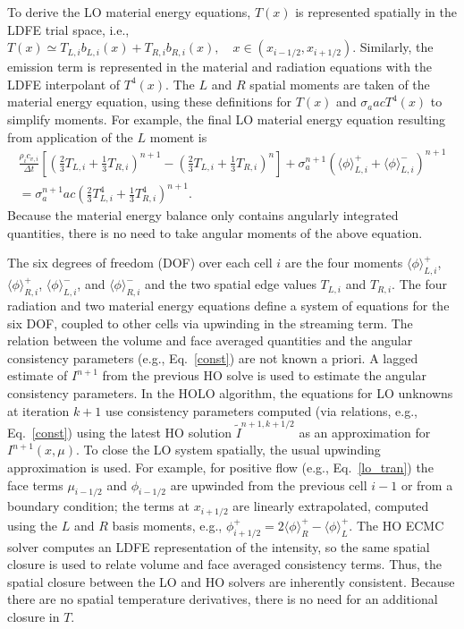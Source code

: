 \documentclass{mc2013}
\newcommand{\mom}[1]{\langle #1 \rangle}
\newcommand{\ir}{{i+1/2}}
\begin{document}
To derive the LO material energy equations, $T(x)$ is represented spatially in
the LDFE trial space, i.e.,
$ T(x) \simeq T_{L,i} b_{L,i}(x) + T_{R,i} b_{R,i}(x),\quad x\in(x_{i-1/2},x_\ir)$.
Similarly, the emission term is represented in the material and radiation equations with the LDFE
interpolant of $T^4(x)$.   The $L$ and $R$ spatial moments are taken of the material
energy equation, using these definitions for $T(x)$ and $\sigma_a a c T^4(x)$ to simplify moments. For example, the final LO material energy
 equation resulting from application of the $L$ moment is
 \begin{multline}\label{lo_mat_dis}
     \frac{\rho_i c_{v,i}}{\Delta t}\left[ \left(\frac{2}{3}T_{L,i} + \frac{1}{3}T_{R,i}
        \right)^{n+1} - \left(\frac{2}{3}T_{L,i} + \frac{1}{3}T_{R,i}
    \right)^{n} \right]  + \sigma_a^{n+1} \left( \mom{\phi}_{L,i}^+ +
    \mom{\phi}_{L,i}^- \right)^{n+1} \\ = \sigma_a^{n+1}a c
\left( \frac{2}{3} T_{L,i}^4 + \frac{1}{3}T_{R,i}^4
        \right)^{n+1}.
\end{multline}
Because the material energy balance
 only contains angularly integrated quantities, there is no need to take angular
 moments of the above equation.  

\label{sec:closure}

The six degrees of freedom (DOF) over each cell $i$ are the four moments $\mom{\phi}_{L,i}^+$,
$\mom{\phi}_{R,i}^+$, $\mom{\phi}_{L,i}^-$, and $\mom{\phi}_{R,i}^-$ and the two
spatial edge values $T_{L,i}$ and $T_{R,i}$. The four radiation and two material
energy equations define a system of equations for the six DOF, coupled to other cells
via upwinding in the streaming term.
The relation between the volume and face averaged quantities and the angular consistency parameters (e.g., Eq.~\eqref{const}) are not known a priori. 
A lagged estimate of $I^{n+1}$ from the previous HO solve is
used to estimate the angular consistency parameters. In the HOLO algorithm, the equations for LO unknowns at iteration $k+1$ use consistency parameters
computed (via relations, e.g., Eq.~\eqref{const}) using the latest HO solution $\tilde{I}^{n+1,k+1/2}$
as an approximation for $I^{n+1}(x,\mu)$. To close the LO system spatially, the usual upwinding
approximation is used.  For example, for positive flow (e.g., Eq.~\eqref{lo_tran}) the face terms $\mu_{i-1/2}$ and $\phi_{i-1/2}$
are upwinded from the previous cell $i-1$ or from a boundary condition; the terms
at $x_{i+1/2}$ are linearly extrapolated, computed using the $L$ and $R$ basis
moments, e.g., $\phi^+_{i+1/2} = 2\mom{\phi}_R^+ - \mom{\phi}_L^+$. 
The HO ECMC solver computes an LDFE representation of the intensity, so the same spatial closure is used to relate volume and face averaged consistency terms.  Thus, the spatial closure between the LO and HO solvers are inherently
consistent.  Because there are no
spatial temperature derivatives, there is no need for an
additional closure in $T$.  
\end{document}
